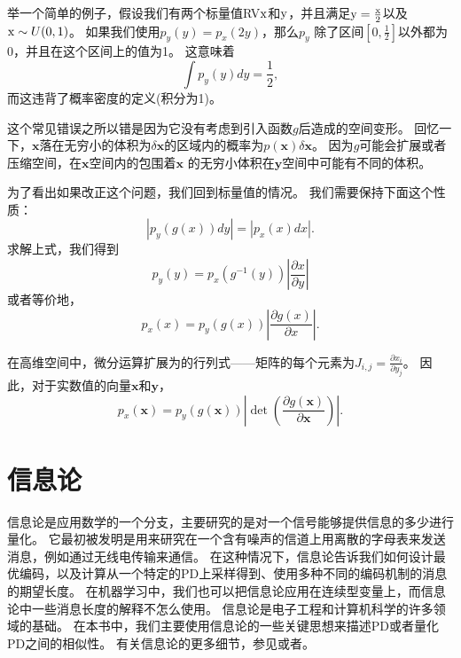 举一个简单的例子，假设我们有两个标量值\gls{RV}$\mathrm{x}$和$\mathrm{y}$，并且满足$\mathrm{y}= \frac{\mathrm{x}}{2}$以及$\mathrm{x} \sim U(0, 1)$。
如果我们使用$p_y(y) = p_x(2y)$，那么$p_y$ 除了区间$[0, \frac{1}{2}]$以外都为0，并且在这个区间上的值为1。
这意味着
\begin{equation}
\int p_y(y)dy = \frac{1}{2},
\end{equation}
而这违背了概率密度的定义(积分为1)。

这个常见错误之所以错是因为它没有考虑到引入函数$g$后造成的空间变形。
回忆一下，$\bm{x}$落在无穷小的体积为$\delta \bm{x}$的区域内的概率为$p(\bm{x})\delta\bm{x}$。
因为$g$可能会扩展或者压缩空间，在$\bm{x}$空间内的包围着$\bm{x}$ 的无穷小体积在$\bm{y}$空间中可能有不同的体积。


为了看出如果改正这个问题，我们回到标量值的情况。
我们需要保持下面这个性质：
\begin{equation}
|p_y(g(x))dy| = |p_x(x)dx|.
\end{equation}
求解上式，我们得到
\begin{equation}
p_y(y) = p_x(g^{-1}(y)) \left \vert \frac{\partial x}{\partial y} \right \vert
\end{equation}
或者等价地，
\begin{equation}
p_x(x) = p_y(g(x)) \left | \frac{\partial g(x)}{\partial x} \right |.
\end{equation}

在高维空间中，微分运算扩展为的行列式——矩阵的每个元素为$J_{i, j} = \frac{\partial x_i}{\partial y_j}$。
因此，对于实数值的向量$\bm{x}$和$\bm{y}$，
\begin{equation}
\label{eqn:3.47}
p_x(\bm{x}) = p_y(g(\bm{x})) \left | \det \left ( \frac{\partial g(\bm{x})}{\partial \bm{x}} \right) \right |.
\end{equation}

\section{信息论}
\label{sec:information_theory}

信息论是应用数学的一个分支，主要研究的是对一个信号能够提供信息的多少进行量化。
它最初被发明是用来研究在一个含有噪声的信道上用离散的字母表来发送消息，例如通过无线电传输来通信。
在这种情况下，信息论告诉我们如何设计最优编码，以及计算从一个特定的\gls{PD}上采样得到、使用多种不同的编码机制的消息的期望长度。
在机器学习中，我们也可以把信息论应用在连续型变量上，而信息论中一些消息长度的解释不怎么使用。
信息论是电子工程和计算机科学的许多领域的基础。
在本书中，我们主要使用信息论的一些关键思想来描述\gls{PD}或者量化\gls{PD}之间的相似性。
有关信息论的更多细节，参见\cite{cover-book2006}或者\cite{MacKay03}。

